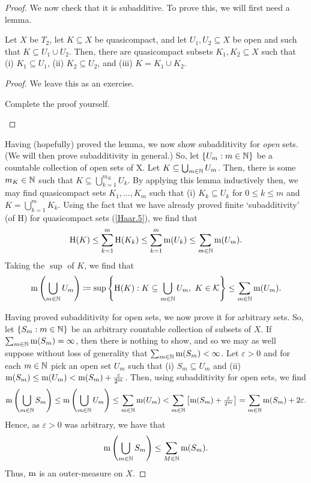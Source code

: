 \begin{thm}
\begin{proof}
We now check that it is subadditive.  To prove this, we will first need a lemma.
\begin{lma}
Let $X$ be $T_2$, let $K\subseteq X$ be quasicompact, and let $U_1,U_2\subseteq X$ be open and such that $K\subseteq U_1\cup U_2$.  Then, there are quasicompact subsets $K_1,K_2\subseteq X$ such that (i) $K_1\subseteq U_1$, (ii) $K_2\subseteq U_2$, and (iii) $K=K_1\cup K_2$.
\begin{proof}
We leave this as an exercise.
\begin{exr}
Complete the proof yourself.
\end{exr}
\end{proof}
\end{lma}
Having (hopefully) proved the lemma, we now show subadditivity for \emph{open} sets.  (We will then prove subadditivity in general.)  So, let $\{ U_m:m\in \mathbb{N} \}$ be a countable collection of open sets of X.  Let $K\subseteq \bigcup _{m\in \mathbb{N}}U_m$.  Then, there is some $m_K\in \mathbb{N}$ such that $K\subseteq \bigcup _{k=1}^{m_K}U_k$.  By applying this lemma inductively then, we may find quasicompact sets $K_1,\ldots ,K_m$ such that (i) $K_k\subseteq U_k$ for $0\leq k\leq m$ and $K=\bigcup _{k=1}^mK_k$.  Using the fact that we have already proved finite `subadditivity' (of $\mathrm{H}$) for quasicompact sets (\cref{Haar.5}), we find that
\begin{equation}
\mathrm{H}(K)\leq \sum _{k=1}^m\mathrm{H}(K_k)\leq \sum _{k=1}^m\mathrm{m} (U_k)\leq \sum _{m\in \mathbb{N}}\mathrm{m} (U_m).
\end{equation}
Taking the $\sup$ of $K$, we find that
\begin{equation}
\mathrm{m} \left( \bigcup _{m\in \mathbb{N}}U_m\right) \coloneqq \sup \left\{ \mathrm{H}(K):K\subseteq \bigcup _{m\in \mathbb{N}}U_m,\ K\in \mathcal{K}\right\} \leq \sum _{m\in \mathbb{N}}\mathrm{m} (U_m).
\end{equation}

Having proved subadditivity for open sets, we now prove it for arbitrary sets.  So, let $\{ S_m:m\in \mathbb{N} \}$ be an arbitrary countable collection of subsets of $X$.  If $\sum _{m\in \mathbb{N}}\mathrm{m} (S_m)=\infty$, then there is nothing to show, and so we may as well suppose without loss of generality that $\sum _{m\in \mathbb{N}}\mathrm{m} (S_m)<\infty$.  Let $\varepsilon >0$ and for each $m\in \mathbb{N}$ pick an open set $U_m$ such that (i) $S_m\subseteq U_m$ and (ii) $\mathrm{m} (S_m)\leq \mathrm{m} (U_m)<\mathrm{m} (S_m)+\frac{\varepsilon}{2^m}$.  Then, using subadditivity for open sets, we find
\begin{equation}
\mathrm{m} \left( \bigcup _{m\in \mathbb{N}}S_m\right) \leq \mathrm{m} \left( \bigcup _{m\in \mathbb{N}}U_m\right) \leq \sum _{m\in \mathbb{N}}\mathrm{m} (U_m)<\sum _{m\in \mathbb{N}}\left[ \mathrm{m} (S_m)+\tfrac{\varepsilon}{2^m}\right] =\sum _{m\in \mathbb{N}}\mathrm{m} (S_m)+2\varepsilon .
\end{equation}
Hence, as $\varepsilon >0$ was arbitrary, we have that
\begin{equation}
\mathrm{m} \left( \bigcup _{m\in \mathbb{N}}S_m\right) \leq \sum _{M\in \mathbb{N}}\mathrm{m} (S_m).
\end{equation}
Thus, $\mathrm{m}$ is an outer-measure on $X$.


\end{proof}
\end{thm}

